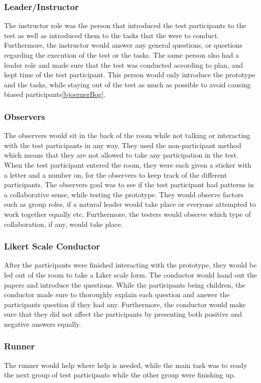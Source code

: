 \subsubsection*{Leader/Instructor}
The instructor role was the person that introduced the test participants to the test as well as introduced them to the tasks that the were to conduct. Furthermore, the instructor would answer any general questions, or questions regarding the execution of the test or the tasks. The same person also had a leader role and made sure that the test was conducted according to plan, and kept time of the test participant. This person would only introduce the prototype and the tasks, while staying out of the test as much as possible to avoid causing biased participants\ref{bjoernerBog}.

\subsubsection*{Observers}
The observers would sit in the back of the room while not talking or interacting with the test participants in any way. They used the non-participant method which means that they are not allowed to take any participation in the test. When the test participant entered the room, they were each given a sticker with a letter and a number on, for the observers to keep track of the different participants. The observers goal was to see if the test participant had patterns in a collaborative sense, while testing the prototype. They would observe factors such as group roles, if a natural leader would take place or everyone attempted to work together equally etc. Furthermore, the testers would observe which type of collaboration, if any, would take place. 

\subsubsection*{Likert Scale Conductor}
After the participants were finished interacting with the prototype, they would be led out of the room to take a Liker scale form. The conductor would hand out the papers and introduce the questions. While the participants being children, the conductor made sure to thoroughly explain each question and answer the participants question if they had any. Furthermore, the conductor would make sure that they did not affect the participants by presenting both positive and negative answers equally.

\subsubsection*{Runner}
The runner would help where help is needed, while the main task was to ready the next group of test participants while the other group were finishing up.

